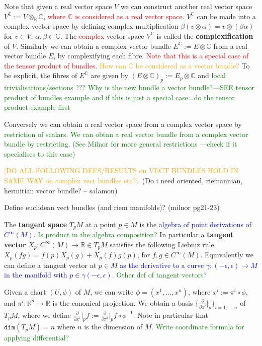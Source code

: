 \documentclass[a4paper]{article}
\theoremstyle{definition} \newtheorem*{definition}{Definition}
\theoremstyle{definition} \newtheorem*{definitions}{Definitions}
\theoremstyle{plain} \newtheorem{theorem}{Theorem}[section]
\theoremstyle{plain} \newtheorem{proposition}[theorem]{Proposition}
\theoremstyle{plain} \newtheorem{corollary}[theorem]{Corollary}
\theoremstyle{plain} \newtheorem{lemma}[theorem]{Lemma}
\theoremstyle{plain} \newtheorem{example}[theorem]{Example}
\newcommand{\checkCorrect}[1]{\textcolor{red}{#1}}
\newcommand{\question}[1]{\textcolor{orange}{#1}}
\newcommand{\explainFurther}[1]{\textcolor{blue}{#1}}
\newcommand{\finish}[1]{\textcolor{green}{#1}}
\newcommand{\defn}[1]{\textbf{#1}}
\newcommand{\realnos}{\mathbb{R}}
\newcommand{\complexnos}{\mathbb{C}}
\begin{document}
Note that given a real vector space $V$ we can construct another real vector space $V^\complexnos := V\otimes_\realnos \complexnos$, \checkCorrect{where $\complexnos$ is considered as a real vector space}. $V^\complexnos$ can be made into a complex vector space by defining complex multiplication $\beta(v\otimes \alpha) = v\otimes (\beta \alpha)$ for $v\in V$, $\alpha, \beta \in \complexnos$. The \checkCorrect{complex} vector space $V^\complexnos$ is called the \defn{complexification} of $V$. Similarly we can obtain a complex vector bundle $E^\complexnos := E\otimes \complexnos$ from a real vector bundle $E$, by complexifying each fibre. \checkCorrect{Note that this is a special case of the tensor product of bundles. \question{How can $\complexnos$ be considered as a vector bundle?}} To be explicit, the fibres of $E^\complexnos$ are given by $(E\otimes \complexnos)_p := E_p\otimes \complexnos$ and \finish{local trivialisations/sections ??? Why is the new bundle a vector bundle?---SEE tensor product of bundles example and if this is just a special case...do the tensor product example first}

Conversely we can obtain a real vector space from a complex vector space by \finish{restriction of scalars. We can obtan a real vector bundle from a complex vector bundle by restricting. (See Milnor for more general restrictions ---check if it specialises to this case)}

\question{[DO ALL FOLLOWING DEFS/RESULTS on VECT BUNDLES HOLD IN SAME WAY on complex vect bundles etc?]}. (Do i need oriented, riemannian, hermitian vector bundle? -- salamon)

Define euclidean vect bundles (and riem manifolds)? (milnor pg21-23)

The \defn{tangent space} $T_p M$ at a point $p\in M$ is  the \explainFurther{algebra of point derivations of $C^\infty (M)$}. \finish{Is product in the algebra composition?}
In particular a \defn{tangent vector} $X_p:C^\infty (M)\to \realnos \in T_p M$ satisfies the following Liebniz rule $X_p(fg)=f(p)X_p(g) + X_p(f)g(p)$, for $f,g\in C^\infty (M)$. Equivalently we can define a tangent vector at $p\in M$ \explainFurther{as the derivative to a curve $\gamma: (-\epsilon, \epsilon)\to M$ in the manifold with $p\in \gamma (-\epsilon, \epsilon)$}. 
 \finish{Other def of tangent vectors?}

Given a chart $(U, \phi)$ of $M$, we can write $\phi = (x^1, \ldots, x^n)$, where $x^i := \pi^i\circ \phi$, and $\pi^i:\realnos^n \to \realnos$ is the canonical projection. We obtain a basis $\{\frac{\partial}{\partial{x^i}} \vert_p\}_{i=1,\ldots, n}$ 
of $T_p M$, where we define $\frac{\partial}{\partial{x^i}} \vert_p f := \frac{\partial}{\partial{\pi^i}}\vert_p f\circ \phi^{-1}$. Note in particular that 
$\mathtt{dim} (T_p M) = n$ where 
$n$ is the dimension of $M$. \finish{Write coordinate formula for applying differential?}
\end{document}

